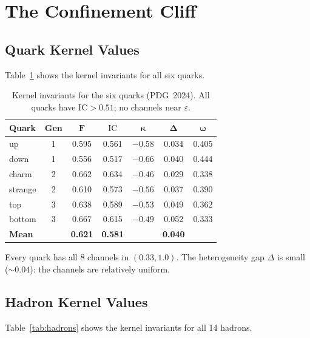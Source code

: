 \documentclass[11pt,a4paper]{article}
\theoremstyle{plain}
\theoremstyle{definition}
\theoremstyle{remark}
\newcommand{\eps}{\varepsilon}
\newcommand{\IC}{\mathrm{IC}}
\begin{document}
\section{The Confinement Cliff}\label{sec:cliff}

\subsection{Quark Kernel Values}

Table~\ref{tab:quarks} shows the kernel invariants for all six
quarks.

\begin{table}[H]
\caption{Kernel invariants for the six quarks (PDG~2024).
All quarks have $\IC > 0.51$; no channels near $\eps$.}
\label{tab:quarks}
\centering\small
\begin{tabular}{@{}lcccccc@{}}
\toprule
\textbf{Quark} & \textbf{Gen} & $\bm{F}$ & $\bm{\IC}$ &
  $\bm{\kappa}$ & $\bm{\Delta}$ & $\bm{\omega}$ \\
\midrule
up      & 1 & 0.595 & 0.561 & $-0.58$ & 0.034 & 0.405 \\
down    & 1 & 0.556 & 0.517 & $-0.66$ & 0.040 & 0.444 \\
charm   & 2 & 0.662 & 0.634 & $-0.46$ & 0.029 & 0.338 \\
strange & 2 & 0.610 & 0.573 & $-0.56$ & 0.037 & 0.390 \\
top     & 3 & 0.638 & 0.589 & $-0.53$ & 0.049 & 0.362 \\
bottom  & 3 & 0.667 & 0.615 & $-0.49$ & 0.052 & 0.333 \\
\midrule
\textbf{Mean} & & \textbf{0.621} & \textbf{0.581} &
  & \textbf{0.040} & \\
\bottomrule
\end{tabular}
\end{table}

Every quark has all 8 channels in $(0.33, 1.0)$.
The heterogeneity gap $\Delta$ is small ($\sim 0.04$): the
channels are relatively uniform.

\subsection{Hadron Kernel Values}

Table~\ref{tab:hadrons} shows the kernel invariants for all 14
hadrons.
\end{document}
